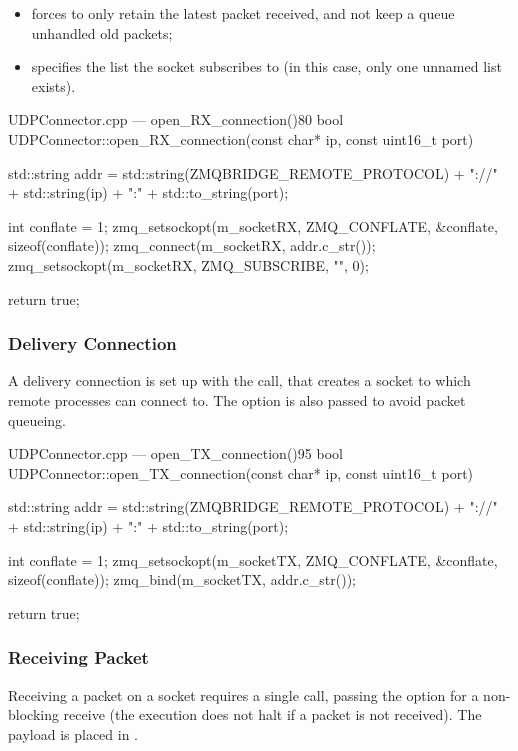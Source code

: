 \begin{itemize}
	\item {} forces  to only retain the latest \gls{packet} received, and not keep a queue unhandled old \glspl{packet};
	\item {} specifies the list the socket subscribes to (in this case, only one unnamed list exists).
\end{itemize}

\begin{codelist}{UDPConnector.cpp --- open\_RX\_connection()}{80}
bool UDPConnector::open_RX_connection(const char* ip, const uint16_t port) {

	std::string addr = std::string(ZMQBRIDGE_REMOTE_PROTOCOL) + "://" + std::string(ip) + ":" + std::to_string(port);

	int conflate = 1;
	zmq_setsockopt(m_socketRX, ZMQ_CONFLATE, &conflate, sizeof(conflate));
	zmq_connect(m_socketRX, addr.c_str());
	zmq_setsockopt(m_socketRX, ZMQ_SUBSCRIBE, "", 0);

	return true;
}
\end{codelist}

\subsubsection{Delivery Connection}

A delivery connection is set up with the  call, that creates a socket to which remote  processes can connect to. The  option is also passed to avoid \gls{packet} queueing.

\begin{codelist}{UDPConnector.cpp --- open\_TX\_connection()}{95}
bool UDPConnector::open_TX_connection(const char* ip, const uint16_t port) {
	std::string addr = std::string(ZMQBRIDGE_REMOTE_PROTOCOL) + "://" + std::string(ip) + ":" + std::to_string(port);

	int conflate = 1;
	zmq_setsockopt(m_socketTX, ZMQ_CONFLATE, &conflate, sizeof(conflate));
	zmq_bind(m_socketTX, addr.c_str());

	return true;
}
\end{codelist}

\subsubsection{Receiving Packet}

Receiving a \gls{packet} on a socket requires a single  call, passing the  option for a non-blocking receive (the execution does not halt if a \gls{packet} is not received). The \gls{payload} is placed in .

